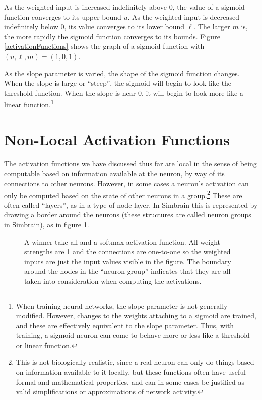    As the weighted input is increased indefinitely above $0$, the value of a
sigmoid function converges to its upper bound $u$. As the weighted input is
decreased indefinitely below $0$, its value converges to its lower bound $\ell$.
The larger $m$ is, the more rapidly the sigmoid function converges to its
bounds. Figure \ref{activationFunctions} shows the graph of a sigmoid function with
$(u,\ell,m) = (1,0,1)$.

As the slope parameter is varied, the shape of the sigmoid function changes. When the slope is
large or ``steep'', the sigmoid will begin to look like the threshold function. When the slope is near $0$, it will begin to look more like a linear function.\footnote{When training neural networks, the slope parameter is not generally modified. However, changes to the weights attaching to a sigmoid are trained, and these are effectively equivalent to the slope parameter. Thus, with training, a sigmoid neuron can come to behave more or less like a threshold or linear function.}

\section{Non-Local Activation Functions}\label{wta_softmax_section}

The activation functions we have discussed thus far are local in the sense of being computable based on information available at the neuron, by way of its connections to other neurons. However, in some cases a neuron's activation can only be computed based on the state of other neurons in a group.\footnote{This is not biologically realistic, since a real neuron can only do things based on information available to it locally, but these functions often have useful formal and mathematical properties, and can in some cases be justified as valid simplifications or approximations of network activity.} These are often called ``layers'', as in a type of node layer. In Simbrain this is represented by drawing a border around the neurons (these structures are called neuron groups in Simbrain), as in figure \ref{wta_softmax}.

\begin{figure}[h]
\centering
{}
\caption[Jeff Yoshimi.]{A winner-take-all and a softmax activation function. All weight strengths are 1 and the connections are one-to-one so the weighted inputs are just the input values visible in the figure. The boundary around the nodes in the ``neuron group'' indicates that they are all taken into consideration when computing the activations.}
\label{wta_softmax}
\end{figure}

